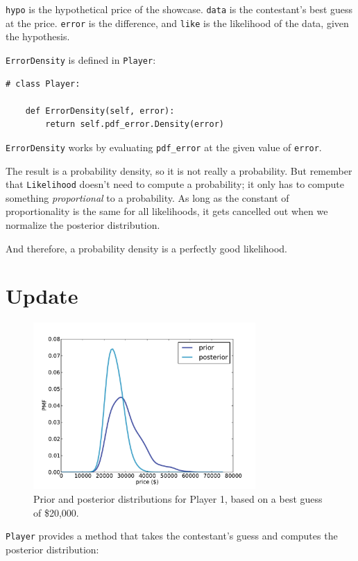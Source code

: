 \documentclass[12pt]{book}
\begin{document}
{\tt hypo} is the hypothetical price of the showcase.  {\tt data}
is the contestant's best guess at the price.  {\tt error} is
the difference, and {\tt like} is the likelihood of the data,
given the hypothesis.

{\tt ErrorDensity} is defined in {\tt Player}:

\begin{verbatim}
# class Player:

    def ErrorDensity(self, error):
        return self.pdf_error.Density(error)
\end{verbatim}

{\tt ErrorDensity} works by evaluating \verb"pdf_error" at
the given value of {\tt error}.

The result is a probability density, so it is not really a probability.
But remember that {\tt Likelihood} doesn't
need to compute a probability; it only has to compute something {\em
  proportional} to a probability.  As long as the constant of
proportionality is the same for all likelihoods, it gets cancelled out
when we normalize the posterior distribution.

And therefore, a probability density is a perfectly good likelihood.


\section{Update}

\begin{figure}
\centerline{\includegraphics[height=2.5in]{figs/price3.pdf}}
\caption{Prior and posterior distributions for Player 1, based on
  a best guess of \$20,000.}
\label{fig.price3}
\end{figure}


{\tt Player} provides a method that takes the contestant's
guess and computes the posterior distribution:
\end{document}
